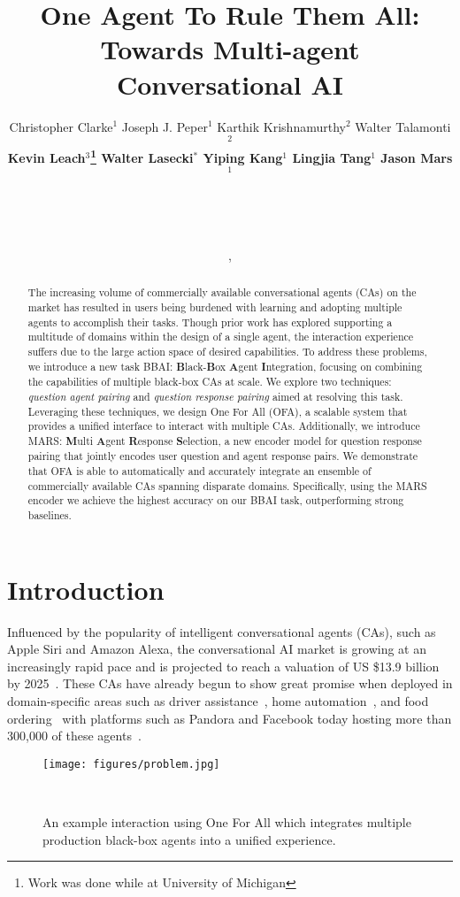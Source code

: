 \documentclass[11pt]{article}
\title{One Agent To Rule Them All: Towards Multi-agent Conversational AI}
\author{
  Christopher Clarke$^1$\hspace{10pt} Joseph J. Peper$^1$\hspace{10pt} Karthik Krishnamurthy$^2$\hspace{10pt} Walter Talamonti$^2$ \\ \textbf{Kevin Leach$^3$\thanks{\hspace{1mm} Work was done while at University of Michigan}\hspace{10pt} Walter Lasecki$^*$\hspace{10pt} Yiping Kang$^1$\hspace{10pt} Lingjia Tang$^1$\hspace{10pt} Jason Mars$^1$}   \vspace{0.3cm}\\
    \text{$^1$University of Michigan, Ann Arbor, MI}\\
    \text{$^2$Ford Motor Company, Dearborn, MI}\\
    \text{$^3$Vanderbilt University, Nashville, TN}\\
    \text{\{csclarke, jpeper, ypkang, lingjia, profmars\}@umich.edu} \\
    \text{\{kkrish65, wtalamo1\}@ford.com},
    \text{kevin.leach@vanderbilt.edu, wslasecki@gmail.com}
}
\begin{document}
\maketitle
\begin{abstract}
The increasing volume of commercially available conversational agents (CAs) on the market has resulted in users being burdened with learning and adopting multiple agents to accomplish their tasks.
Though prior work has explored supporting a multitude of domains within the design of a single agent, the interaction experience suffers due to the large action space of desired capabilities.
To address these problems, we introduce a new task BBAI: \textbf{B}lack-\textbf{B}ox \textbf{A}gent \textbf{I}ntegration, focusing on combining the capabilities of multiple black-box CAs at scale.
We explore two techniques: \emph{question agent pairing} and \emph{question response pairing} aimed at resolving this task.
Leveraging these techniques, we design One For All (OFA), a scalable system that provides a unified interface to interact with multiple CAs.
Additionally, we introduce MARS: \textbf{M}ulti \textbf{A}gent \textbf{R}esponse \textbf{S}election, a new encoder model for question response pairing that jointly encodes user question and agent response pairs.
We demonstrate that OFA is able to automatically and accurately integrate an ensemble of commercially available CAs spanning disparate domains.
Specifically, using the MARS encoder we achieve the highest accuracy on our BBAI task, outperforming strong baselines.
\end{abstract}

\section{Introduction}

Influenced by the popularity of intelligent conversational agents (CAs), such as Apple Siri and Amazon Alexa, the conversational AI market is growing at an increasingly rapid pace and is projected to reach a valuation of US \$13.9 billion by 2025~\cite{market_and_markets_2020}.
These CAs have already begun to show great promise when deployed in domain-specific areas such as driver assistance~\cite{Lin2018Adasa}, home automation~\cite{Luria2017}, and food ordering~\cite{foodbot} with platforms such as Pandora and Facebook today hosting more than 300,000 of these agents~\cite{Chaves:2018:SMC:3173574.3173765,nealon_2018}.


\begin{figure}
  \centering
  \texttt{[image: figures/problem.jpg]}
  \vspace{-1.8pc}
  \caption{An example interaction using One For All which integrates multiple production black-box agents into a unified experience.  }
  ~\label{fig:ofa}
  \vspace{-2.8pc}
\end{figure}
\end{document}
